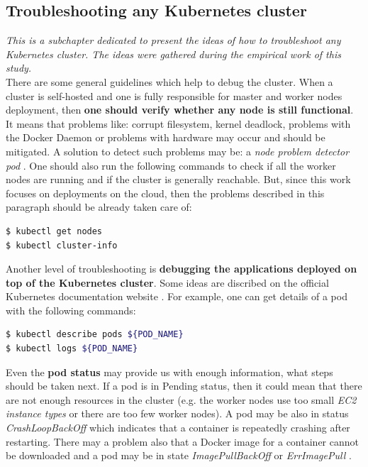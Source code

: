 \subsection{Troubleshooting any Kubernetes cluster}
\textit{This is a subchapter dedicated to present the ideas of how to troubleshoot any Kubernetes cluster. The ideas were gathered during the empirical work of this study.}
\\

There are some general guidelines which help to debug the cluster. When a cluster is self-hosted and one is fully responsible for master and worker nodes deployment, then \textbf{one should verify whether any node is still functional}. It means that problems like: corrupt filesystem, kernel deadlock, problems with the Docker Daemon or problems with hardware may occur and should be mitigated. A solution to detect such problems may be: a \textit{node problem detector pod} \cite{book-mastering-k8s}. One should also run the following commands to check if all the worker nodes are running and if the cluster is generally reachable. But, since this work focuses on deployments on the cloud, then the problems described in this paragraph should be already taken care of:
\begin{lstlisting}[basicstyle=\scriptsize,xleftmargin=0cm,label=lst:5-ts1,caption={Getting information about a cluster},captionpos=b,language=Bash ]
$ kubectl get nodes
$ kubectl cluster-info
\end{lstlisting}

Another level of troubleshooting is \textbf{debugging the applications deployed on top of the Kubernetes cluster}. Some ideas are discribed on the official Kubernetes documentation website \cite{k8s-deb}. For example, one can get details of a pod with the following commands:
\begin{lstlisting}[basicstyle=\scriptsize,xleftmargin=0cm,label=lst:5-ts2,caption={Getting information about pods},captionpos=b,language=Bash ]
$ kubectl describe pods ${POD_NAME}
$ kubectl logs ${POD_NAME}
\end{lstlisting}

Even the \textbf{pod status} may provide us with enough information, what steps should be taken next. If a pod is in Pending status, then it could mean that there are not enough resources in the cluster (e.g. the worker nodes use too small \textit{EC2 instance types} or there are too few worker nodes). A pod may be also in status \textit{CrashLoopBackOff} which indicates that a container is repeatedly crashing after restarting. There may a problem also that a Docker image for a container cannot be downloaded and a pod may be in state \textit{ImagePullBackOff} or \textit{ErrImagePull} \cite{k8s-google-tr}.

